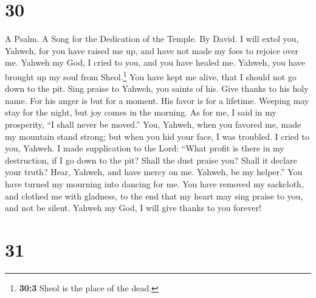 \hypertarget{section-29}{%
\section{30}\label{section-29}}

A Psalm. A Song for the Dedication of the Temple. By David.
 I will extol you, Yahweh, for you have raised me up, and
have not made my foes to rejoice over me.  Yahweh my God,
I cried to you, and you have healed me.  Yahweh, you have
brought up my soul from Sheol.\footnote{\textbf{30:3} Sheol is the place
  of the dead.} You have kept me alive, that I should not go down to the
pit.  Sing praise to Yahweh, you saints of his. Give
thanks to his holy name.  For his anger is but for a
moment. His favor is for a lifetime. Weeping may stay for the night, but
joy comes in the morning.  As for me, I said in my
prosperity, ``I shall never be moved.''  You, Yahweh, when
you favored me, made my mountain stand strong; but when you hid your
face, I was troubled.  I cried to you, Yahweh. I made
supplication to the Lord:  ``What profit is there in my
destruction, if I go down to the pit? Shall the dust praise you? Shall
it declare your truth?  Hear, Yahweh, and have mercy on
me. Yahweh, be my helper.''  You have turned my mourning
into dancing for me. You have removed my sackcloth, and clothed me with
gladness,  to the end that my heart may sing praise to
you, and not be silent. Yahweh my God, I will give thanks to you
forever!

\hypertarget{section-30}{%
\section{31}\label{section-30}}

